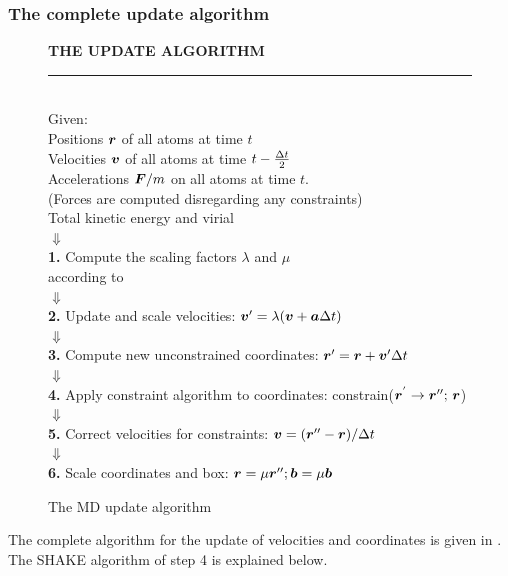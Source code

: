 \subsubsection{The complete update algorithm}
\begin{figure}
\begin{center}
\addtolength{\fboxsep}{0.5cm}
\begin{shadowenv}[12cm]
{\large \bf THE UPDATE ALGORITHM}
\rule{\textwidth}{2pt} \\
Given:\\
Positions $\mbox{\boldmath ${r}$}$ of all atoms at time $t$ \\
Velocities $\mbox{\boldmath ${v}$}$ of all atoms at time $t-{\frac {\Delta t}{2}}$ \\
Accelerations $\mbox{\boldmath ${F}$}/m$ on all atoms at time $t$.\\
(Forces are computed disregarding any constraints)\\
Total kinetic energy and virial \\
$\Downarrow$ \\
{\bf 1.} Compute the scaling factors $\lambda$ and $\mu$\\
according to \\   
$\Downarrow$ \\
{\bf 2.} Update and scale velocities: $\mbox{\boldmath ${v}$}' =  \lambda (\mbox{\boldmath ${v}$} +
\mbox{\boldmath ${a}$} \Delta t)$ \\
$\Downarrow$ \\
{\bf 3.} Compute new unconstrained coordinates: $\mbox{\boldmath ${r}$}' = \mbox{\boldmath ${r}$} + \mbox{\boldmath ${v}$}'
\Delta t$ \\
$\Downarrow$ \\
{\bf 4.} Apply constraint algorithm to coordinates: constrain($\mbox{\boldmath ${r}$}^{'} \rightarrow  \mbox{\boldmath ${r}$}'';
\,  \mbox{\boldmath ${r}$}$) \\
$\Downarrow$ \\
{\bf 5.} Correct velocities for constraints: $\mbox{\boldmath ${v}$} = (\mbox{\boldmath ${r}$}'' -
\mbox{\boldmath ${r}$}) / \Delta t$ \\
$\Downarrow$ \\
{\bf 6.} Scale coordinates and box: $\mbox{\boldmath ${r}$} = \mu \mbox{\boldmath ${r}$}''; \mbox{\boldmath ${b}$} =
\mu  \mbox{\boldmath ${b}$}$ \\
\end{shadowenv}
\caption{The MD update algorithm}
\label{fig:complete-update}
\end{center}
\end{figure}
The complete algorithm for the update of velocities and coordinates is
given in . The SHAKE algorithm of step
4 is explained below. 

